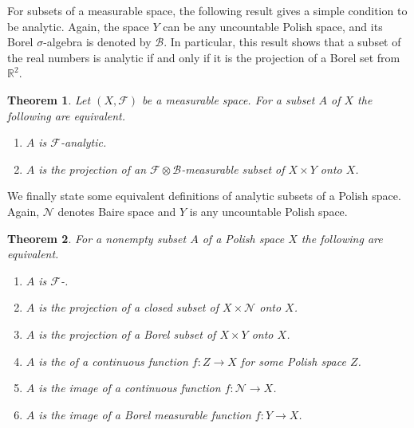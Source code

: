 \documentclass[12pt]{article}
\newtheorem*{theorem*}{Theorem}
\begin{document}
For subsets of a measurable space, the following result gives a simple condition to be analytic. Again, the space $Y$ can be any uncountable Polish space, and its Borel $\sigma$-algebra is denoted by $\mathcal{B}$. In particular, this result shows that a subset of the real numbers is analytic if and only if it is the projection of a Borel set from $\mathbb{R}^2$.

\begin{theorem*}
Let $(X,\mathcal{F})$ be a measurable space. For a subset $A$ of $X$ the following are equivalent.
\begin{enumerate}
\item $A$ is $\mathcal{F}$-analytic.
\item $A$ is the projection of an $\mathcal{F}\otimes\mathcal{B}$-measurable subset of $X\times Y$ onto $X$.
\end{enumerate}
\end{theorem*}

We finally state some equivalent definitions of analytic subsets of a Polish space. Again, $\mathcal{N}$ denotes Baire space and $Y$ is any uncountable Polish space.

\begin{theorem*}
For a nonempty subset $A$ of a Polish space $X$ the following are equivalent.
\begin{enumerate}
\item\label{item:1} $A$ is $\mathcal{F}$-.
\item\label{item:2} $A$ is the projection of a closed subset of $X\times\mathcal{N}$ onto $X$.
\item\label{item:3} $A$ is the projection of a Borel subset of $X\times Y$ onto $X$.
\item\label{item:4} $A$ is the  of a continuous function $f\colon Z\to X$ for some Polish space $Z$.
\item\label{item:5} $A$ is the image of a continuous function $f\colon \mathcal{N}\to X$.
\item\label{item:6} $A$ is the image of a Borel measurable function $f\colon Y\to X$.
\end{enumerate}
\end{theorem*}

\end{document}
